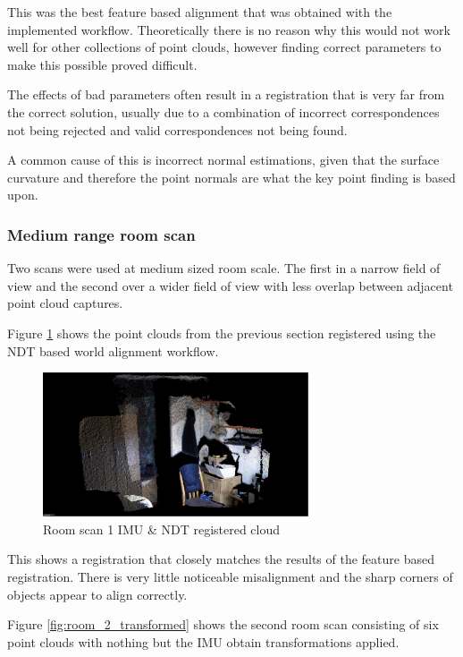 \documentclass{entcs}
\begin{document}
This was the best feature based alignment that was obtained with the implemented
workflow. Theoretically there is no reason why this would not work well for
other collections of point clouds, however finding correct parameters to make
this possible proved difficult.

The effects of bad parameters often result in a registration that is very far
from the correct solution, usually due to a combination of incorrect
correspondences not being rejected and valid correspondences not being found.

A common cause of this is incorrect normal estimations, given that the surface
curvature and therefore the point normals are what the key point finding is
based upon.

\subsubsection{Medium range room scan}

Two scans were used at medium sized room scale. The first in a narrow field of
view and the second over a wider field of view with less overlap between
adjacent point cloud captures.

Figure \ref{fig:room_1_ndt} shows the point clouds from the previous section
registered using the NDT based world alignment workflow.

\begin{figure}[h!]
  \centering
  \includegraphics[width=0.7\textwidth]{graphics/room_1_world_ndt.eps}
  \caption{Room scan 1 IMU \& NDT registered cloud}
  \label{fig:room_1_ndt}
\end{figure}

This shows a registration that closely matches the results of the feature based
registration. There is very little noticeable misalignment and the sharp corners
of objects appear to align correctly.

Figure \ref{fig:room_2_transformed} shows the second room scan consisting of six
point clouds with nothing but the IMU obtain transformations applied.
\end{document}
